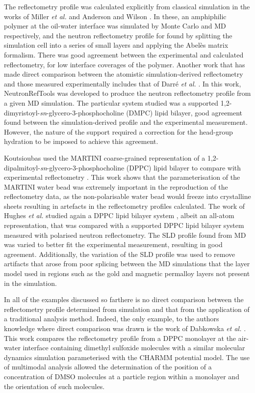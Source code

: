 \documentclass[amsmath,amssymb,twocolumn,superscriptaddress]{revtex4-1}
\begin{document}
The reflectometry profile was calculated explicitly from classical simulation in the works of Miller \emph{et al.} and Anderson and Wilson \cite{Miller2003,Anderson2004}.
In these, an amphiphilic polymer at the oil-water interface was simulated by Monte Carlo and MD respectively, and the neutron reflectometry profile for found by splitting the simulation cell into a series of small layers and applying the Abel\`{e}s matrix formalism.
There was good agreement between the experimental and calculated reflectometry, for low interface coverages of the polymer.
Another work that has made direct comparison between the atomistic simulation-derived reflectometry and those measured experimentally includes that of Darr\'{e} \emph{et al.} \cite{Darre2015}.
In this work, NeutronRefTools was developed to produce the neutron reflectometry profile from a given MD simulation.
The particular system studied was a supported 1,2-dimyristoyl-\emph{sn}-glycero-3-phosphocholine (DMPC) lipid bilayer, good agreement found between the simulation-derived profile and the experimental measurement.
However, the nature of the support required a correction for the head-group hydration to be imposed to achieve this agreement.

Koutsioubas used the MARTINI coarse-grained representation of a 1,2-dipalmitoyl-\emph{sn}-glycero-3-phosphocholine (DPPC) lipid bilayer to compare with experimental reflectometry \cite{Koutsioubas2016}.
This work shows that the parameterisation of the MARTINI water bead was extremely important in the reproduction of the reflectometry data, as the non-polarisable water bead would freeze into crystalline sheets resulting in artefacts in the reflectometry profiles calculated.
The work of Hughes \emph{et al.} studied again a DPPC lipid bilayer system \cite{Hughes2016}, albeit an all-atom representation, that was compared with a supported DPPC lipid bilayer system measured with polarised neutron reflectometry.
The SLD profile found from MD was varied to better fit the experimental measurement, resulting in good agreement.
Additionally, the variation of the SLD profile was used to remove artifacts that arose from poor splicing between the MD simulations that the layer model used in regions such as the gold and magnetic permalloy layers not present in the simulation.

In all of the examples discussed so farthere is no direct comparison between the reflectometry profile determined from simulation and that from the application of a traditional analysis method.
Indeed, the only example, to the authors knowledge where direct comparison was drawn is the work of Dabkowska \emph{et al.} \cite{Dabkowska2014}.
This work compares the reflectometry profile from a DPPC monolayer at the air-water interface containing dimethyl sulfoxide molecules with a similar molecular dynamics simulation parameterised with the CHARMM potential model.
The use of multimodal analysis allowed the determination of the position of a concentration of DMSO molecules at a particle region within a monolayer and the orientation of such molecules.
\end{document}
